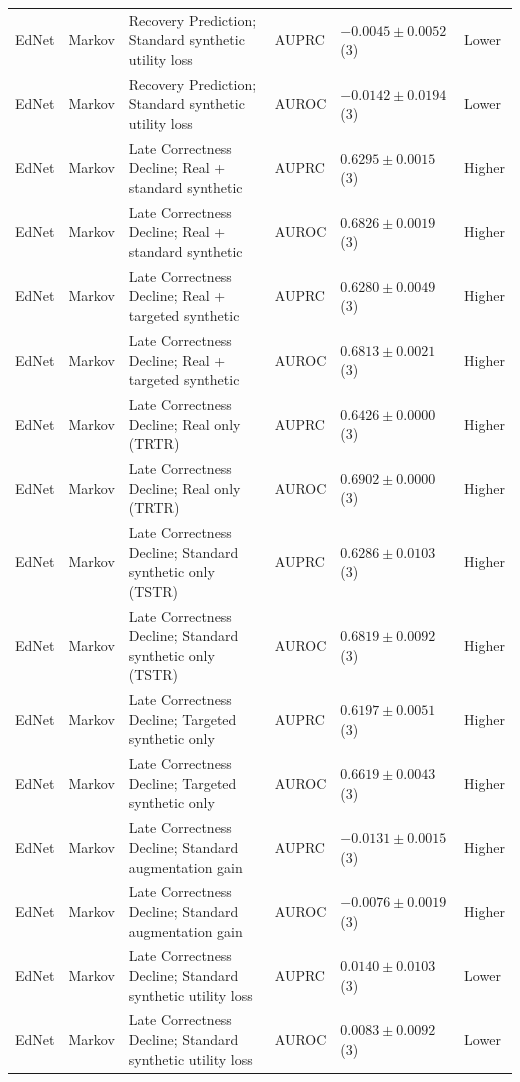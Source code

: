 \begin{longtable}{@{}p{2.25cm}p{2.05cm}p{4.7cm}p{5.0cm}p{2.6cm}p{1.25cm}@{}}
EdNet & Markov & Recovery Prediction; Standard synthetic utility loss & AUPRC & $-0.0045 \mathbin{\pm} 0.0052$ (3) & Lower \\
EdNet & Markov & Recovery Prediction; Standard synthetic utility loss & AUROC & $-0.0142 \mathbin{\pm} 0.0194$ (3) & Lower \\
EdNet & Markov & Late Correctness Decline; Real + standard synthetic & AUPRC & $0.6295 \mathbin{\pm} 0.0015$ (3) & Higher \\
EdNet & Markov & Late Correctness Decline; Real + standard synthetic & AUROC & $0.6826 \mathbin{\pm} 0.0019$ (3) & Higher \\
EdNet & Markov & Late Correctness Decline; Real + targeted synthetic & AUPRC & $0.6280 \mathbin{\pm} 0.0049$ (3) & Higher \\
EdNet & Markov & Late Correctness Decline; Real + targeted synthetic & AUROC & $0.6813 \mathbin{\pm} 0.0021$ (3) & Higher \\
EdNet & Markov & Late Correctness Decline; Real only (TRTR) & AUPRC & $0.6426 \mathbin{\pm} 0.0000$ (3) & Higher \\
EdNet & Markov & Late Correctness Decline; Real only (TRTR) & AUROC & $0.6902 \mathbin{\pm} 0.0000$ (3) & Higher \\
EdNet & Markov & Late Correctness Decline; Standard synthetic only (TSTR) & AUPRC & $0.6286 \mathbin{\pm} 0.0103$ (3) & Higher \\
EdNet & Markov & Late Correctness Decline; Standard synthetic only (TSTR) & AUROC & $0.6819 \mathbin{\pm} 0.0092$ (3) & Higher \\
EdNet & Markov & Late Correctness Decline; Targeted synthetic only & AUPRC & $0.6197 \mathbin{\pm} 0.0051$ (3) & Higher \\
EdNet & Markov & Late Correctness Decline; Targeted synthetic only & AUROC & $0.6619 \mathbin{\pm} 0.0043$ (3) & Higher \\
EdNet & Markov & Late Correctness Decline; Standard augmentation gain & AUPRC & $-0.0131 \mathbin{\pm} 0.0015$ (3) & Higher \\
EdNet & Markov & Late Correctness Decline; Standard augmentation gain & AUROC & $-0.0076 \mathbin{\pm} 0.0019$ (3) & Higher \\
EdNet & Markov & Late Correctness Decline; Standard synthetic utility loss & AUPRC & $0.0140 \mathbin{\pm} 0.0103$ (3) & Lower \\
EdNet & Markov & Late Correctness Decline; Standard synthetic utility loss & AUROC & $0.0083 \mathbin{\pm} 0.0092$ (3) & Lower \\

\end{longtable}
